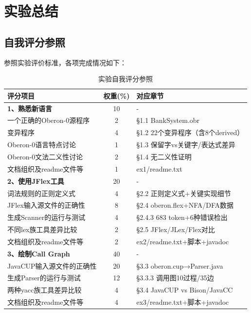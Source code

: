 \chapter{实验总结}

\section{自我评分参照}

参照实验评价标准，各项完成情况如下：

\begin{table}[htbp]
    \centering
    \caption{实验自我评分参照}
    \label{tab:self-eval}
    \begin{tabular}{|p{5.5cm}|c|p{8cm}|}
    \hline
    \textbf{评分项目} & \textbf{权重(\%)} & \textbf{对应章节} \\
    \hline
    \quad \textbf{1、熟悉新语言} & 10 & - \\
    \hline
    \quad 一个正确的Oberon-0源程序 & 2 & \S1.1 BankSystem.obr \\
    \quad 变异程序 & 4 & \S1.2 22个变异程序（含8个derived） \\
    \quad Oberon-0语言特点讨论 & 1 & \S1.3 保留字vs关键字/表达式差异 \\
    \quad Oberon-0文法二义性讨论 & 2 & \S1.4 无二义性证明 \\
    \quad 文档组织及readme文件等 & 1 & ex1/readme.txt \\
    \hline
    \quad \textbf{2、使用JFlex工具} & 20 & - \\
    \hline
    \quad 词法规则的正则定义式 & 4 & \S2.2 正则定义式+关键实现细节 \\
    \quad JFlex输入源文件的正确性 & 8 & \S2.4 oberon.flex+NFA/DFA数据 \\
    \quad 生成Scanner的运行与测试 & 4 & \S2.4.3 683 token+6种错误检出 \\
    \quad 不同lex族工具差异比较 & 2 & \S2.5 JFlex/JLex/Flex对比 \\
    \quad 文档组织及readme文件等 & 2 & ex2/readme.txt+脚本+javadoc \\
    \hline
    \quad \textbf{3、绘制Call Graph} & 40 & - \\
    \hline
    \quad JavaCUP输入源文件的正确性 & 20 & \S3.3 oberon.cup→Parser.java \\
    \quad 生成Parser的运行与测试 & 12 & \S3.3.3 调用图10过程/35边 \\
    \quad 两种yacc族工具差异比较 & 4 & \S3.4 JavaCUP vs Bison/JavaCC \\
    \quad 文档组织及readme文件等 & 4 & ex3/readme.txt+脚本+javadoc \\

\end{tabular}
\end{table}

